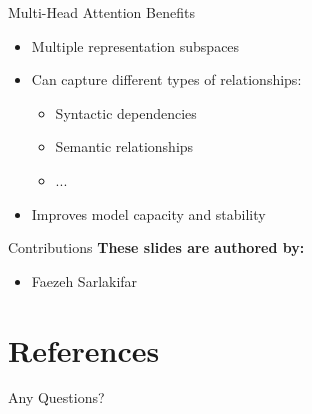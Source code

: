 \documentclass[serif, aspectratio=169]{beamer}
\begin{document}
\begin{frame}{Multi-Head Attention Benefits}
    \begin{itemize}
        \item Multiple representation subspaces
        \item Can capture different types of relationships:
        \begin{itemize}
            \item Syntactic dependencies
            \item Semantic relationships
            \item ...
        \end{itemize}
        \item Improves model capacity and stability
    \end{itemize}
\end{frame}

\begin{frame}{Contributions}
	\textbf{These slides are authored by:}
	\begin{itemize}
		\item Faezeh Sarlakifar
	\end{itemize}
	
\end{frame}


\section{References}

\begin{frame}[allowframebreaks]
    
    
    \nocite{*} %
\end{frame}


\begin{frame}
    \begin{center}
        {\Huge Any Questions?}
    \end{center}
\end{frame}
\end{document}
